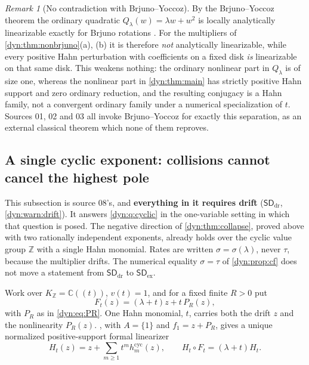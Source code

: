 \documentclass[11pt,letterpaper]{article}
\theoremstyle{definition}
\theoremstyle{remark}
\newtheorem{remark}[remark]{Remark}
\newcommand{\C}{\mathbb C}
\newcommand{\Z}{\mathbb Z}
\newcommand{\sddr}{\mathsf{SD}_{\mathrm{dr}}}
\newcommand{\sdex}{\mathsf{SD}_{\mathrm{ex}}}
\numberwithin{equation}{section}
\begin{document}
\begin{remark}[No contradiction with Brjuno--Yoccoz]\label{dyn:rem:nocontra}
By the Brjuno--Yoccoz theorem the ordinary quadratic
$Q_\lambda(w)=\lambda w+w^{2}$ is locally analytically linearizable exactly
for Brjuno rotations \cite{Yoccoz,BuffCheritat}. For the multipliers of
\cref{dyn:thm:nonbrjuno}(a), (b) it is therefore \emph{not} analytically
linearizable, while every positive Hahn perturbation with coefficients on a
fixed disk \emph{is} linearizable on that same disk. This weakens nothing:
the ordinary nonlinear part in $Q_\lambda$ is of size one, whereas the
nonlinear part in \cref{dyn:thm:main} has strictly positive Hahn support
and zero ordinary reduction, and the resulting conjugacy is a Hahn family,
not a convergent ordinary family under a numerical specialization of $t$.
Sources 01, 02 and 03 all invoke Brjuno--Yoccoz for exactly this
separation, as an external classical theorem which none of them reproves.
\end{remark}

\subsection{A single cyclic exponent: collisions cannot cancel the highest pole}
\label{dyn:cyc:subsec}

This subsection is source 08's, and \textbf{everything in it requires
drift} ($\sddr$, \cref{dyn:warn:drift}). It answers \cref{dyn:q:cyclic} in
the one-variable setting in which that question is posed. The negative
direction of \cref{dyn:thm:collapse}, proved above with two rationally
independent exponents, already holds over the cyclic value group $\Z$ with
a single Hahn monomial. Rates are written $\sigma=\sigma(\lambda)$, never
$\tau$, because the multiplier drifts. The numerical equality $\sigma=\tau$
of \cref{dyn:prop:cf} does not move a statement from $\sddr$ to $\sdex$.

Work over $K_{\Z}=\C((t))$, $v(t)=1$, and for a fixed finite $R>0$ put
\begin{equation}\label{dyn:cyc:eq:input}
 F_t(z)=(\lambda+t)z+t\,P_R(z),
\end{equation}
with $P_R$ as in \eqref{dyn:eq:PR}. One Hahn monomial, $t$, carries both
the drift $z$ and the nonlinearity $P_R(z)$. , with
$A=\{1\}$ and $f_1=z+P_R$, gives a unique normalized positive-support
formal linearizer
\begin{equation}\label{dyn:cyc:eq:H}
 H_t(z)=z+\sum_{m\ge1}t^{m}h^{\mathrm{cyc}}_m(z),\qquad
 H_t\circ F_t=(\lambda+t)H_t .
\end{equation}
\end{document}
